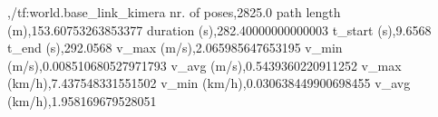 ,/tf:world.base_link_kimera
nr. of poses,2825.0
path length (m),153.60753263853377
duration (s),282.40000000000003
t_start (s),9.6568
t_end (s),292.0568
v_max (m/s),2.065985647653195
v_min (m/s),0.008510680527971793
v_avg (m/s),0.5439360220911252
v_max (km/h),7.437548331551502
v_min (km/h),0.030638449900698455
v_avg (km/h),1.958169679528051
